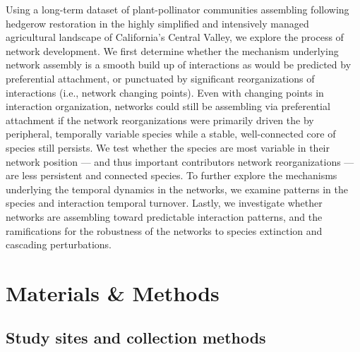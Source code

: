 \documentclass[12pt]{article}
\begin{document}
Using a long-term dataset of plant-pollinator communities assembling
following hedgerow restoration in the highly simplified and
intensively managed agricultural landscape of California's Central
Valley, we explore the process of network development. We first
determine whether the mechanism underlying network assembly is a
smooth build up of interactions as would be predicted by preferential
attachment, or punctuated by significant reorganizations of
interactions (i.e., network changing points). Even with changing
points in interaction organization, networks could still be assembling
via preferential attachment if the network reorganizations were
primarily driven the by peripheral, temporally variable species while
a stable, well-connected core of species still persists. We test
whether the species are most variable in their network position ---
and thus important contributors network reorganizations --- are less
persistent and connected species. To further explore the mechanisms
underlying the temporal dynamics in the networks, we examine patterns
in the species and interaction temporal turnover. Lastly, we
investigate whether networks are assembling toward predictable
interaction patterns, and the ramifications for the robustness of the
networks to species extinction and cascading perturbations.


\section*{Materials \& Methods}
\label{sec:methods}

\subsection*{Study sites and collection methods}
\label{sec:study-sites}
\end{document}
